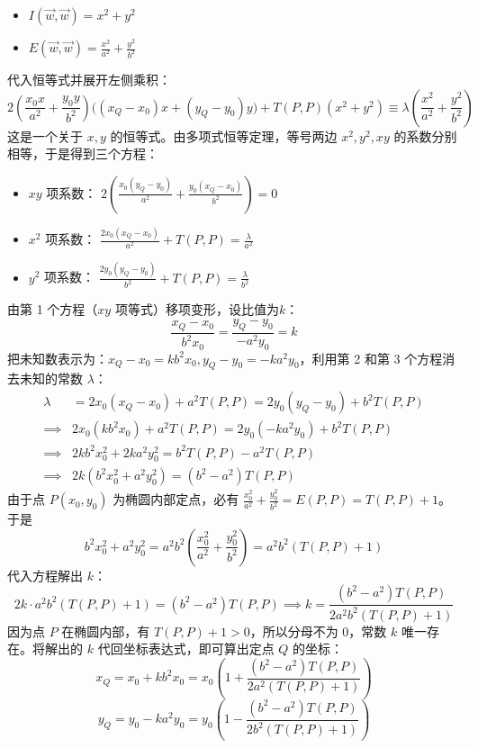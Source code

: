 \begin{solution}
\begin{itemize}
\item $I(\vec{w},\vec{w}) = x^2 + y^2$
\item $E(\vec{w},\vec{w}) = \frac{x^2}{a^2} + \frac{y^2}{b^2}$
\end{itemize}
代入恒等式并展开左侧乘积：
$$2 \left( \frac{x_0 x}{a^2} + \frac{y_0 y}{b^2} \right) \big( (x_Q - x_0)x + (y_Q - y_0)y \big) + T(P,P) (x^2 + y^2) \equiv \lambda \left( \frac{x^2}{a^2} + \frac{y^2}{b^2} \right)$$
这是一个关于 $x, y$ 的恒等式。由多项式恒等定理，等号两边 $x^2, y^2, xy$ 的系数分别相等，于是得到三个方程：
\begin{itemize}
\item $xy$ 项系数： $2 \left( \frac{x_0 (y_Q - y_0)}{a^2} + \frac{y_0 (x_Q - x_0)}{b^2} \right) = 0$
\item $x^2$ 项系数： $\frac{2 x_0 (x_Q - x_0)}{a^2} + T(P,P) = \frac{\lambda}{a^2}$
\item $y^2$ 项系数： $\frac{2 y_0 (y_Q - y_0)}{b^2} + T(P,P) = \frac{\lambda}{b^2}$
\end{itemize}
由第 1 个方程（$xy$ 项等式）移项变形，设比值为$k$：$$\frac{x_Q - x_0}{b^2 x_0} = \frac{y_Q - y_0}{-a^2 y_0}=k$$
把未知数表示为：$x_Q - x_0 = k b^2 x_0, y_Q - y_0 = -k a^2 y_0$，利用第 2 和第 3 个方程消去未知的常数 $\lambda$：
\begin{align*}
\lambda &= 2 x_0 (x_Q - x_0) + a^2 T(P,P) = 2 y_0 (y_Q - y_0) + b^2 T(P,P)\\
\implies&2 x_0 (k b^2 x_0) + a^2 T(P,P) = 2 y_0 (-k a^2 y_0) + b^2 T(P,P)\\
\implies&2k b^2 x_0^2 + 2k a^2 y_0^2 = b^2 T(P,P) - a^2 T(P,P)\\
\implies&2k (b^2 x_0^2 + a^2 y_0^2) = (b^2 - a^2) T(P,P)
\end{align*}
由于点 $P(x_0,y_0)$ 为椭圆内部定点，必有 $\frac{x_0^2}{a^2} + \frac{y_0^2}{b^2} = E(P,P) = T(P,P) + 1$。于是
$$b^2 x_0^2 + a^2 y_0^2 = a^2 b^2 \left( \frac{x_0^2}{a^2} + \frac{y_0^2}{b^2} \right) = a^2 b^2 (T(P,P) + 1)$$
代入方程解出 $k$：
$$2k \cdot a^2 b^2 (T(P,P) + 1) = (b^2 - a^2) T(P,P) \implies k = \frac{(b^2 - a^2) T(P,P)}{2 a^2 b^2 (T(P,P) + 1)}$$
因为点 $P$ 在椭圆内部，有 $T(P,P)+1 > 0$，所以分母不为 0，常数 $k$ 唯一存在。将解出的 $k$ 代回坐标表达式，即可算出定点 $Q$ 的坐标：
$$x_Q = x_0 + k b^2 x_0 = x_0 \left( 1 + \frac{(b^2 - a^2) T(P,P)}{2 a^2 (T(P,P) + 1)} \right)$$
$$y_Q = y_0 - k a^2 y_0 = y_0 \left( 1 - \frac{(b^2 - a^2) T(P,P)}{2 b^2 (T(P,P) + 1)} \right)$$
\end{solution}

